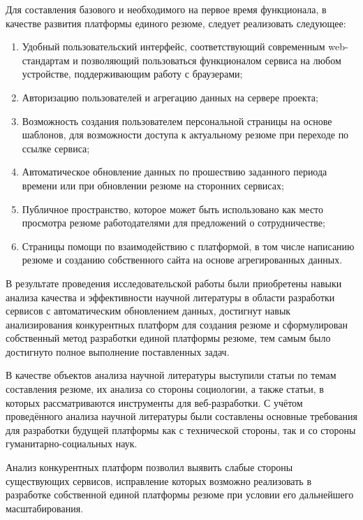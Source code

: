 \documentclass[master, och, pract]{SCWorks}
\begin{document}
Для составления базового и необходимого на первое время функционала, в качестве развития 
платформы единого резюме, следует реализовать следующее:
\begin{enumerate}
    \item Удобный пользовательский интерфейс, соответствующий современным web-стандартам 
    и позволяющий пользоваться функционалом сервиса на любом устройстве, поддерживающим 
    работу с браузерами;
    \item Авторизацию пользователей и агрегацию данных на сервере проекта;
    \item Возможность создания пользователем персональной страницы на основе шаблонов, 
    для возможности доступа к актуальному резюме при переходе по ссылке сервиса;
    \item Автоматическое обновление данных по прошествию заданного периода времени или 
    при обновлении резюме на сторонних сервисах;
    \item Публичное пространство, которое может быть использовано как место просмотра 
    резюме работодателями для предложений о сотрудничестве;
    \item Страницы помощи по взаимодействию с платформой, в том числе написанию резюме 
    и созданию собственного сайта на основе агрегированных данных.
\end{enumerate}


\newpage
\conclusion
В результате проведения исследовательской работы были приобретены навыки анализа 
качества и эффективности научной литературы в области разработки сервисов 
с автоматическим обновлением данных, достигнут навык анализирования конкурентных 
платформ для создания резюме и сформулирован собственный метод разработки 
единой платформы резюме, тем самым было достигнуто полное выполнение поставленных задач.

В качестве объектов анализа научной литературы выступили статьи по темам составления 
резюме, их анализа со стороны социологии, а также статьи, в которых рассматриваются 
инструменты для веб-разработки. С учётом проведённого анализа научной литературы 
были составлены основные требования для разработки будущей платформы как с технической 
стороны, так и со стороны гуманитарно-социальных наук.

Анализ конкурентных платформ позволил выявить слабые стороны существующих сервисов, 
исправление которых возможно реализовать в разработке собственной единой платформы 
резюме при условии его дальнейшего масштабирования.
\end{document}
